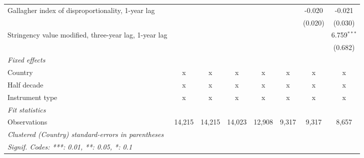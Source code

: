 \begin{table}[htbp]
\begin{tabular}{lccccccc}
      Gallagher index of disproportionality, 1-year lag     &         &         &         &         &               & -0.020        & -0.021\\   
                                                            &         &         &         &         &               & (0.020)       & (0.030)\\   
      Stringency value modified, three-year lag, 1-year lag &         &         &         &         &               &               & 6.759$^{***}$\\   
                                                            &         &         &         &         &               &               & (0.682)\\   
      \emph{Fixed effects}\\
      Country                                               & x       & x       & x       & x       & x             & x             & x\\  
      Half decade                                           & x       & x       & x       & x       & x             & x             & x\\  
      Instrument type                                       & x       & x       & x       & x       & x             & x             & x\\  
      \midrule \emph{Fit statistics}\\
      Observations                                          & 14,215  & 14,215  & 14,023  & 12,908  & 9,317         & 9,317         & 8,657\\  
      \midrule
      \multicolumn{8}{l}{\emph{Clustered (Country) standard-errors in parentheses}}\\
      \multicolumn{8}{l}{\emph{Signif. Codes: ***: 0.01, **: 0.05, *: 0.1}}\\
   \end{tabular}
\end{table}



